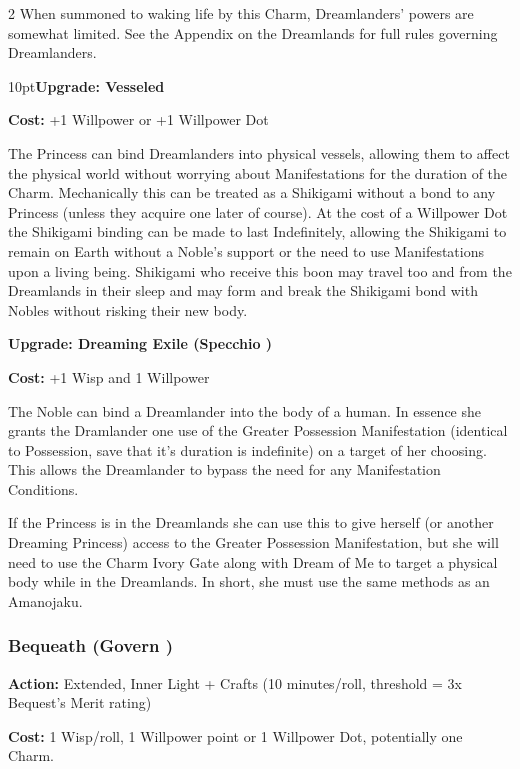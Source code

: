 \begin{multicols}{2}
When summoned to waking life by this Charm, Dreamlanders' powers are somewhat limited. See the Appendix on the Dreamlands for full rules governing Dreamlanders. 

\begin{myindentpar}{10pt}\textbf{Upgrade: Vesseled}

\noindent \textbf{Cost:} +1 Willpower or +1 Willpower Dot

The Princess can bind Dreamlanders into physical vessels, allowing them to affect the physical world without worrying about Manifestations for the duration of the Charm. Mechanically this can be treated as a Shikigami without a bond to any Princess (unless they acquire one later of course). At the cost of a Willpower Dot the Shikigami binding can be made to last Indefinitely, allowing the Shikigami to remain on Earth without a Noble's support or the need to use Manifestations upon a living being. Shikigami who receive this boon may travel too and from the Dreamlands in their sleep and may form and break the Shikigami bond with Nobles without risking their new body. 

\textbf{Upgrade: Dreaming Exile (Specchio \textbullet\textbullet)}

\textbf{Cost:} +1 Wisp and 1 Willpower

The Noble can bind a Dreamlander into the body of a human. In essence she grants the Dramlander one use of the Greater Possession Manifestation (identical to Possession, save that it's duration is indefinite) on a target of her choosing. This allows the Dreamlander to bypass the need for any Manifestation Conditions. 

If the Princess is in the Dreamlands she can use this to give herself (or another Dreaming Princess) access to the Greater Possession Manifestation, but she will need to use the Charm Ivory Gate along with Dream of Me to target a physical body while in the Dreamlands. In short, she must use the same methods as an Amanojaku.

\end{myindentpar}

\subsubsection*{Bequeath (Govern \textbullet\textbullet\textbullet)}

\noindent \textbf{Action:} Extended, Inner Light + Crafts (10 minutes/roll, threshold = 3x Bequest's Merit rating)

\noindent \textbf{Cost:} 1 Wisp/roll, 1 Willpower point or 1 Willpower Dot, potentially one Charm. 


\end{multicols}
